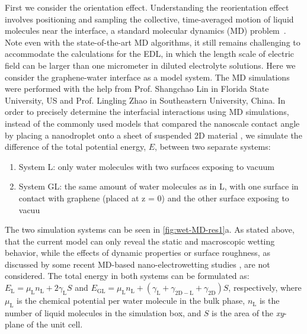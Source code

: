 First we consider the orientation effect. Understanding the
reorientation effect involves positioning and sampling the collective,
time-averaged motion of liquid molecules near the interface, a
standard molecular dynamics (MD)
problem~.
%
Note even with the
state-of-the-art MD algorithms, it still remains challenging to accommodate
the calculations for the EDL, in which the length scale of electric
field can be larger than one micrometer in diluted electrolyte
solutions.
Here we consider the graphene-water interface as a model system. The
MD simulations were performed with the help from Prof. Shangchao Lin
in Florida State University, US and Prof. Lingling Zhao in
Southeastern University, China.
%
In order to precisely determine the interfacial interactions using MD
simulations, instead of the commonly used models that compared the
nanoscale contact angle by placing a nano\-droplet onto a sheet of
suspended 2D material
\cite{Ostrowski_2014_tunable,Daub_2007_nanoscale_EW,Ren_2015_interfacial,Taherian_2015_asym_EW},
we simulate the difference of the total potential energy,
\(E\), between two separate systems:
\begin{enumerate}
\item System L: only water molecules with two surfaces exposing to vacuum
  
\item System GL: the same amount of water molecules as in L, with one
  surface in contact with graphene (placed at z = 0) and the other
  surface exposing to vacuu
\end{enumerate}
%
The two simulation systems can be seen in \autoref{fig:wet-MD-res1}a.
%
As stated above, that the current model can only reveal the static and
macroscopic wetting behavior, while the effects of dynamic properties
or surface roughness, as discussed by some recent MD-based
nano-electrowetting studies \cite{Yuan_2010_PF,Zhao_2015_pillar}, are
not considered.
%
The total energy in both systems
can be formulated as:
\(E_{\mathrm{L}} = \mu_{\mathrm{L}}n_{\mathrm{L}} +
2\gamma_{\mathrm{L}}S\) and
\(E_{\mathrm{GL}}=\mu_{\mathrm{L}}n_{\mathrm{L}}+(\gamma_{\mathrm{L}}
+ \gamma_{\mathrm{2D-L}} + \gamma_{\mathrm{2D}})S\), respectively,
where \(\mu_{\mathrm{L}}\) is the chemical potential per water
molecule in the bulk phase, \(n_{\mathrm{L}}\) is the number of liquid
molecules in the simulation box, and \(S\) is the area of the 
\emph{xy}-plane of the unit cell.
